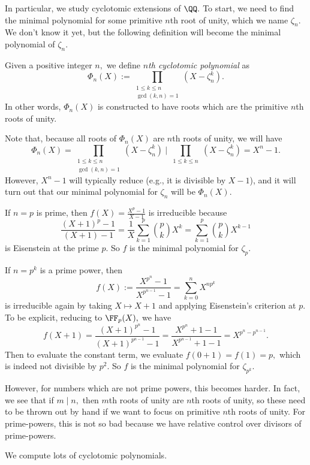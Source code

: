 In particular, we study cyclotomic extensions of $\QQ.$ To start, we need to find the minimal polynomial for some primitive $n$th root of unity, which we name $\zeta_n.$ We don't know it yet, but the following definition will become the minimal polynomial of $\zeta_n.$
\begin{definition}
	Given a positive integer $n,$ we define \textit{$n$th cyclotomic polynomial} as
	\[\Phi_n(X):=\prod_{\substack{1\le k\le n\\\gcd(k,n)=1}}\left(X-\zeta_n^k\right).\]
	In other words, $\Phi_n(X)$ is constructed to have roots which are the primitive $n$th roots of unity.
\end{definition}
Note that, because all roots of $\Phi_n(X)$ are $n$th roots of unity, we will have
\[\Phi_n(X)=\prod_{\substack{1\le k\le n\\\gcd(k,n)=1}}\left(X-\zeta_n^k\right)~\bigg|~\prod_{\substack{1\le k\le n}}\left(X-\zeta_n^k\right)=X^n-1.\]
However, $X^n-1$ will typically reduce (e.g., it is divisible by $X-1$), and it will turn out that our minimal polynomial for $\zeta_n$ will be $\Phi_n(X).$
\begin{example}
	If $n=p$ is prime, then $f(X)=\frac{X^p-1}{X-1}$ is irreducible because
	\[\frac{(X+1)^p-1}{(X+1)-1}=\frac1X\sum_{k=1}^p\binom pkX^k=\sum_{k=1}^p\binom pkX^{k-1}\]
	is Eisenstein at the prime $p.$ So $f$ is the minimal polynomial for $\zeta_p.$
\end{example}
\begin{example} \label{ex:primepowercyclo}
	If $n=p^k$ is a prime power, then
	\[f(X):=\frac{X^{p^n}-1}{X^{p^{n-1}}-1}=\sum_{k=0}^nX^{np^k}\]
	is irreducible again by taking $X\mapsto X+1$ and applying Eisenstein's criterion at $p.$ To be explicit, reducing to $\FF_p(X),$ we have
	\[f(X+1)=\frac{(X+1)^{p^n}-1}{(X+1)^{p^{n-1}}-1}=\frac{X^{p^n}+1-1}{X^{p^{n-1}}+1-1}=X^{p^n-p^{n-1}}.\]
	Then to evaluate the constant term, we evaluate $f(0+1)=f(1)=p,$ which is indeed not divisible by $p^2.$ So $f$ is the minimal polynomial for $\zeta_{p^k}.$
\end{example}
However, for numbers which are not prime powers, this becomes harder. In fact, we see that if $m\mid n,$ then $m$th roots of unity are $n$th roots of unity, so these need to be thrown out by hand if we want to focus on primitive $n$th roots of unity. For prime-powers, this is not so bad because we have relative control over divisors of prime-powers.
\begin{exe}
	We compute lots of cyclotomic polynomials.
\end{exe}
